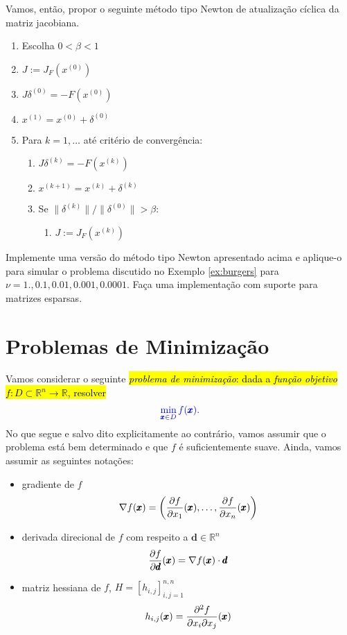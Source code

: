 Vamos, então, propor o seguinte  método tipo Newton de atualização cíclica da matriz jacobiana.
\begin{enumerate}
\item Escolha $0<\beta<1$
\item $J := J_F(x^{(0)})$
\item $J\delta^{(0)}=-F(x^{(0)})$
\item $x^{(1)} = x^{(0)} + \delta^{(0)}$
\item Para $k=1,\ldots$ até critério de convergência:
  \begin{enumerate}
  \item $J\delta^{(k)}=-F(x^{(k)})$
  \item $x^{(k+1)}=x^{(k)} + \delta^{(k)}$
  \item Se $\|\delta^{(k)}\|/\|\delta^{(0)}\| > \beta$:
    \begin{enumerate}
    \item $J := J_F(x^{(k)})$
    \end{enumerate}
  \end{enumerate}
\end{enumerate}

\begin{exer}
  Implemente uma versão do método tipo Newton apresentado acima e aplique-o para simular o problema discutido no Exemplo \ref{ex:burgers} para $\nu = 1., 0.1, 0.01, 0.001, 0.0001$. Faça uma implementação com suporte para matrizes esparsas.
\end{exer}

\section{Problemas de Minimização}\label{cap_otimizacao_sec_minimi}
\badgeRevisar

Vamos considerar o seguinte \hl{\emph{problema de minimização}: dada a \emph{função objetivo} $f:D\subset \mathbb{R}^n\to\mathbb{R}$, resolver}
\begin{equation}\color{blue}\min_{\pmb{x}\in D} f(\pmb{x}).
\end{equation}
No que segue e salvo dito explicitamente ao contrário, vamos assumir que o problema está bem determinado e que $f$ é suficientemente suave. Ainda, vamos assumir as seguintes notações:
\begin{itemize}
\item gradiente de $f$
  \begin{equation}
    \nabla f(\pmb{x}) = \left(\frac{\partial f}{\partial x_1}(\pmb{x}),\dotsc,\frac{\partial f}{\partial x_n}(\pmb{x})\right)
  \end{equation}
\item derivada direcional de $f$ com respeito a $\pmb{d}\in\mathbb{R}^n$
  \begin{equation}
    \frac{\partial f}{\partial \pmb{d}}(\pmb{x}) = \nabla f(\pmb{x})\cdot \pmb{d}
  \end{equation}
\item matriz hessiana de $f$, $H=[h_{i,j}]_{i,j=1}^{n,n}$
  \begin{equation}
    h_{i,j}(\pmb{x}) = \frac{\partial^2 f}{\partial x_i\partial x_j}(\pmb{x})
  \end{equation}
\end{itemize}

